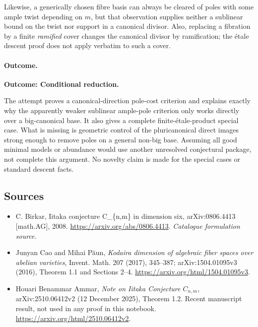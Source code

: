 \documentclass[11pt,a4paper]{article}
\numberwithin{equation}{section}
\begin{document}
Likewise, a generically chosen fibre basis can always be cleared of poles
with some ample twist depending on $m$, but that observation supplies
neither a sublinear bound on the twist nor support in a canonical divisor.
Also, replacing a fibration by a finite \emph{ramified} cover changes the
canonical divisor by ramification; the \'etale descent proof does not
apply verbatim to such a cover.

\paragraph{Outcome.}
\textbf{Outcome: Conditional reduction.}

The attempt proves a canonical-direction pole-cost criterion and explains
exactly why the apparently weaker sublinear ample-pole criterion only
works directly over a big-canonical base. It also gives a complete
finite-\'etale-product special case. What is missing is geometric control
of the pluricanonical direct images strong enough to remove poles on a
general non-big base. Assuming all good minimal models or abundance would
use another unresolved conjectural package, not complete this argument.
No novelty claim is made for the special cases or standard descent facts.

\subsection{Sources}
\begin{itemize}\raggedright
\item[\textnormal{[S1]}]\hypertarget{source:statement:1}{} C. Birkar, Iitaka conjecture C\_\{n,m\} in dimension six, arXiv:0806.4413 [math.AG], 2008.
\url{https://arxiv.org/abs/0806.4413}.
{\small\textit{Catalogue formulation source.}}
\item[\textnormal{[E1]}]\hypertarget{extra:statement:1}{} Junyan Cao and Mihai P\u{a}un,
\emph{Kodaira dimension of algebraic fiber spaces over abelian varieties},
Invent. Math. 207 (2017), 345--387; arXiv:1504.01095v3 (2016),
Theorem 1.1 and Sections 2--4.
\url{https://arxiv.org/html/1504.01095v3}.
\item[\textnormal{[E2]}]\hypertarget{extra:statement:2}{} Houari Benammar Ammar,
\emph{Note on Iitaka Conjecture $C_{n,m}$}, arXiv:2510.06412v2
(12 December 2025), Theorem 1.2. Recent manuscript result, not used in
any proof in this notebook.
\url{https://arxiv.org/html/2510.06412v2}.
\end{itemize}
\end{document}
